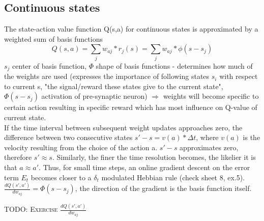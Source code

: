 \documentclass[11pt]{article}
\begin{document}
\subsection{Continuous states}
The state-action value function Q(s,a) for continuous states is approximated by a weighted sum of basis functions
\[
	Q(s,a) = \sum_j w_{aj}*r_j(s) = \sum_j w_{aj}*\phi(s-s_j)
\]
$s_j$ center of basis function, $\Phi$ shape of basis functions - determines how much of the weights are used (expresses the importance of following states $s_i$ with respect to current s, "the signal/reward these states give to the current state", $\Phi(s-s_j)$ activation of pre-synaptic neuron) $\Rightarrow$ weights will become specific to certain action resulting in specific reward which has most influence on Q-value of current state.\\
If the time interval between subsequent weight updates approaches zero, the difference between two consecutive states $s' - s = v(a) * \Delta t$, where $v(a)$ is the velocity resulting from the choice of the action a. $s'-s$ approximates zero, therefore $s' \approx s$. Similarly, the finer the time resolution becomes, the likelier it is that $a \approx a'$. Thus, for small time steps, an online gradient descent on the error term $E_t$ becomes closer to a $\delta_t$ modulated Hebbian rule (check sheet 8, ex.5). 
$\frac{dQ(s',a')}{dw_{aj}}=\Phi(s-s_j)$, the direction of the gradient is the basis function itself.

\textsc{TODO: Exercise} $\frac{dQ(s',a')}{dw_{aj}}$
\end{document}
